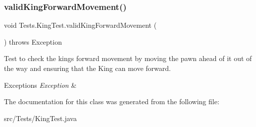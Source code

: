 \subsubsection{\texorpdfstring{valid\+King\+Forward\+Movement()}{validKingForwardMovement()}}
{\footnotesize\ttfamily void Tests.\+King\+Test.\+valid\+King\+Forward\+Movement (\begin{DoxyParamCaption}{ }\end{DoxyParamCaption}) throws Exception}

Test to check the king\textquotesingle{}s forward movement by moving the pawn ahead of it out of the way and ensuring that the King can move forward. 
\begin{DoxyExceptions}{Exceptions}
{\em Exception} & \\
\hline
\end{DoxyExceptions}


The documentation for this class was generated from the following file\+:\begin{DoxyCompactItemize}
\item 
src/\+Tests/King\+Test.\+java\end{DoxyCompactItemize}
